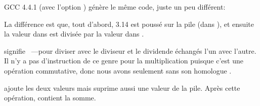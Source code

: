
GCC 4.4.1 (avec l'option \Othree) génère le même code, juste un peu différent:



La différence est que, tout d'abord, 3.14 est poussé sur la pile (dans ), et
ensuite la valeur dans  est divisée par la valeur dans .


\FDIVR signifie ~---pour diviser avec le diviseur et le dividende
échangés l'un avec l'autre.
Il n'y a pas d'instruction de ce genre pour la multiplication puisque c'est une opération
commutative, donc nous avons seulement \FMUL sans son homologue .


\FADDP ajoute les deux valeurs mais suprime aussi une valeur de la pile.
Après cette opération,  contient la somme.


